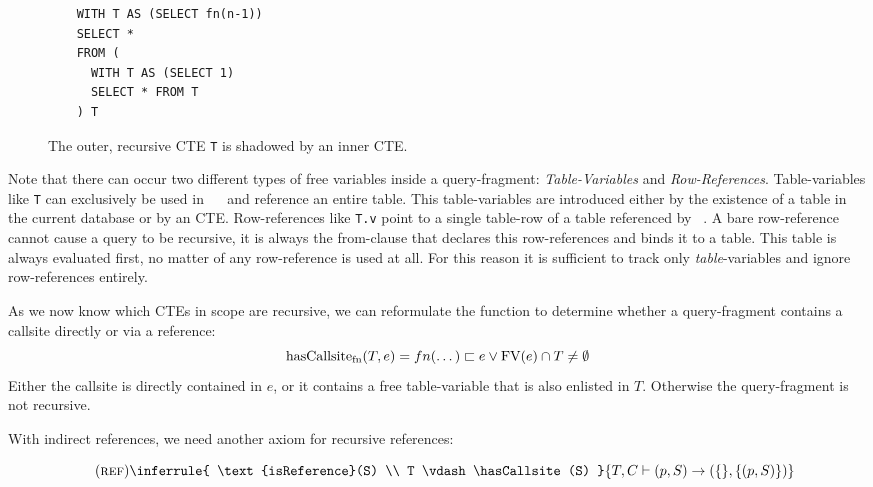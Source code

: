 \begin{wrapfigure}{r}{0.4\textwidth}
    \begin{verbatim}
    WITH T AS (SELECT fn(n-1))
    SELECT *
    FROM (
      WITH T AS (SELECT 1)
      SELECT * FROM T
    ) T
    \end{verbatim}
    \caption{The outer, recursive CTE \texttt{T} is shadowed by an inner CTE.}
    \label{lst:indirect_callsite_ref}
\end{wrapfigure}

Note that there can occur two different types of free variables inside a query-fragment: \textit{Table-Variables} and \textit{Row-References}. Table-variables like \texttt{T} can exclusively be used in ~\FROM~ and reference an entire table. This table-variables are introduced either by the existence of a table in the current database or by an CTE. Row-references like \texttt{T.v} point to a single table-row of a table referenced by ~\FROM. A bare row-reference cannot cause a query to be recursive, it is always the from-clause that declares this row-references and binds it to a table. This table is always evaluated first, no matter of any row-reference is used at all. For this reason it is sufficient to track only \textit{table}-variables and ignore row-references entirely.

As we now know which CTEs in scope are recursive, we can reformulate the function to determine whether a query-fragment contains a callsite directly or via a reference:
$$\operatorname{\text{hasCallsite}_{fn}}(T, e) = fn(\dots) \sqsubset e \lor \operatorname{\text{\rm FV}}(e) \cap T \neq \emptyset$$
Either the callsite is directly contained in $e$, or it contains a free table-variable that is also enlisted in $T$. Otherwise the query-fragment is not recursive.

With indirect references, we need another axiom for recursive references:

$$\quad(\textsc{ref})\inferrule{
   \text{isReference}(S) \\
   T \vdash \hasCallsite(S)
}{
    T, C \vdash (p, S) \rightarrow (\{\}, \{(p, S)\})
}$$


